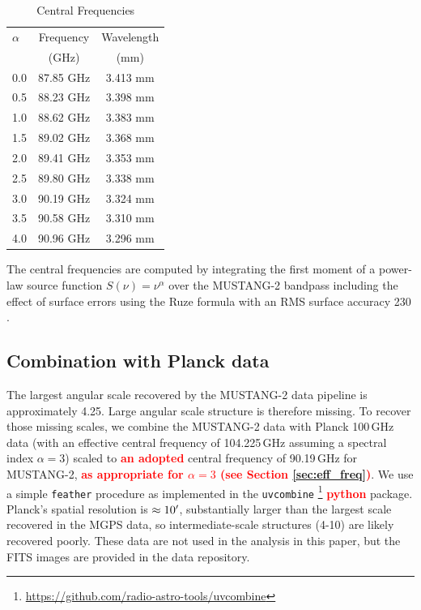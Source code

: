 \documentclass[twocolumn]{aastex62}
\def\edit#1{{\textcolor{red}{\textbf{#1}}}}
\def\change#1{{\textcolor{red}{\textbf{#1}}}}
\newcommand{\MUSTANG}{MUSTANG-2\xspace}
\begin{document}
\begin{table}[htp]
\centering
    \caption{Central Frequencies}
\begin{tabular}{lcc}
    \label{tab:centralfreq}
$\alpha$ & Frequency & Wavelength\\
         & (GHz)       & (mm) \\
\hline
0.0 & 87.85 GHz & 3.413 mm\\
0.5 & 88.23 GHz & 3.398 mm\\
1.0 & 88.62 GHz & 3.383 mm\\
1.5 & 89.02 GHz & 3.368 mm\\
2.0 & 89.41 GHz & 3.353 mm\\
2.5 & 89.80 GHz & 3.338 mm\\
3.0 & 90.19 GHz & 3.324 mm\\
3.5 & 90.58 GHz & 3.310 mm\\
4.0 & 90.96 GHz & 3.296 mm\\
\hline
\end{tabular}
\par The central frequencies are computed by integrating the first moment of a
power-law source function $S(\nu) = \nu^{\alpha}$ over the \MUSTANG
bandpass including the effect of surface errors using the Ruze formula
with an RMS surface accuracy 230 \um \citep{Frayer2018a}.

\end{table}

\subsection{Combination with Planck data\label{sec:feather}}
The largest angular scale recovered by the \MUSTANG data pipeline is
approximately 4.25\arcmin.  Large angular scale structure is therefore missing.
To recover those missing scales, we combine the \MUSTANG data with
Planck 100\,GHz data (with an effective central frequency of 104.225\,GHz
assuming a spectral index $\alpha=3$) scaled to \change{an adopted} central frequency
of 90.19\,GHz for \MUSTANG, \change{as appropriate for $\alpha=3$ (see Section
\ref{sec:eff_freq})}.  We use a simple \texttt{feather} procedure
\citep{Cotton2017b} as implemented in the \texttt{uvcombine}
\footnote{\url{https://github.com/radio-astro-tools/uvcombine}} \edit{python}
package.
Planck's spatial resolution is $\approx10\mbox{$^\prime$}$, substantially larger
than the largest scale recovered in the MGPS data, so intermediate-scale
structures (4-10\arcmin) are likely recovered poorly.
These data are not used in the analysis in this paper, but the
FITS images are provided in the data repository.
\end{document}
